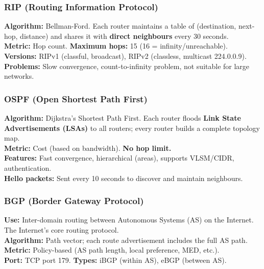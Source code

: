 \documentclass[12pt,a4paper]{article}
\begin{document}
\subsubsection*{RIP (Routing Information Protocol)}
\begin{tcolorbox}[formulabox, title={\textbf{RIP --- Distance Vector Protocol}}]
\textbf{Algorithm:} Bellman-Ford. Each router maintains a table of (destination, next-hop, distance) and shares it with \textbf{direct neighbours} every 30 seconds.\\
\textbf{Metric:} Hop count. \textbf{Maximum hops:} 15 (16 = infinity/unreachable).\\
\textbf{Versions:} RIPv1 (classful, broadcast), RIPv2 (classless, multicast 224.0.0.9).\\
\textbf{Problems:} Slow convergence, count-to-infinity problem, not suitable for large networks.
\end{tcolorbox}

\subsubsection*{OSPF (Open Shortest Path First)}
\begin{tcolorbox}[formulabox, title={\textbf{OSPF --- Link State Protocol}}]
\textbf{Algorithm:} Dijkstra's Shortest Path First. Each router floods \textbf{Link State Advertisements (LSAs)} to all routers; every router builds a complete topology map.\\
\textbf{Metric:} Cost (based on bandwidth). \textbf{No hop limit.}\\
\textbf{Features:} Fast convergence, hierarchical (areas), supports VLSM/CIDR, authentication.\\
\textbf{Hello packets:} Sent every 10 seconds to discover and maintain neighbours.
\end{tcolorbox}

\subsubsection*{BGP (Border Gateway Protocol)}
\begin{tcolorbox}[formulabox, title={\textbf{BGP --- Path Vector Protocol}}]
\textbf{Use:} Inter-domain routing between Autonomous Systems (AS) on the Internet. The Internet's core routing protocol.\\
\textbf{Algorithm:} Path vector; each route advertisement includes the full AS path.\\
\textbf{Metric:} Policy-based (AS path length, local preference, MED, etc.).\\
\textbf{Port:} TCP port 179. \textbf{Types:} iBGP (within AS), eBGP (between AS).
\end{tcolorbox}
\end{document}
